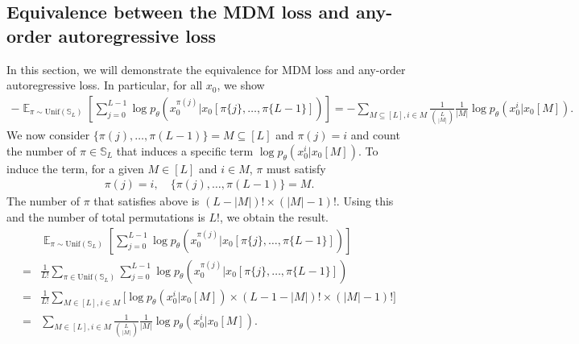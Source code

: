 \subsection{Equivalence between the MDM loss and any-order autoregressive loss}
\label{sec:mdm-aoarm}

In this section, we will demonstrate the equivalence for MDM loss and any-order autoregressive loss. In particular, for all $x_0$, we show
\begin{align*}
   -\mathop{\mathbb{E}}_{\pi\sim\mathrm{Unif}(\mathbb{S}_L)}\left[\sum_{j=0}^{L-1} \log p_\theta \left( x_0^{\pi(j)} \Big| x_0 [\pi\{j\},\ldots,\pi \{L-1\}] \right) \right] = -\sum_{ M\subseteq [L],i \in M}\frac{1}{\binom{L}{|M|}} \frac{1}{| M |} \displaystyle   \log p_\theta(x^i_0 | x_0[M]). 
\end{align*}
We now consider $\{\pi(j),\dots,\pi(L-1) \}=M \subseteq [L]$ and $\pi(j) =i $ and count the number of $\pi \in \mathbb S_L$ that induces a specific term $\log p_\theta(x_0^i | x_0[M])$. To induce the term, for a given $M\in [L]$ and $i \in M$, $\pi$ must satisfy
\begin{align*}
    \pi(j) = i, \quad  \{\pi(j),\dots,\pi(L-1) \}=M.
\end{align*}
The number of $\pi$ that satisfies above is $(L-|M|)! \times (|M|-1)!$. Using this and the number of total permutations is $L!$, we obtain the result.
\begin{align*}
&\mathop{\mathbb{E}}_{\pi\sim\mathrm{Unif}(\mathbb{S}_L)}\left[\sum_{j=0}^{L-1} \log p_\theta \left( x_0^{\pi(j)} \Big| x_0 [\pi\{j\},\ldots,\pi \{L-1\}] \right) \right] \\
=&\frac{1}{L!}\sum_{\pi \in \mathrm{Unif}(\mathbb{S}_L) } \sum_{j=0}^{L-1} \log p_\theta \left( x_0^{\pi(j)} \Big| x_0 [\pi\{j\},\ldots,\pi \{L-1\}] \right) \\
=& \frac{1}{L!}\sum_{M \in [L], i \in M} \big[\log p_\theta(x_0^i | x_0[M]) \times(L-1-|M|)! \times (|M|-1)! \big] \\
=& \sum_{M \in [L], i \in M} \frac{1}{\binom{L}{|M|}} \frac{1}{|M|} \log p_\theta(x_0^i | x_0[M]).
\end{align*}